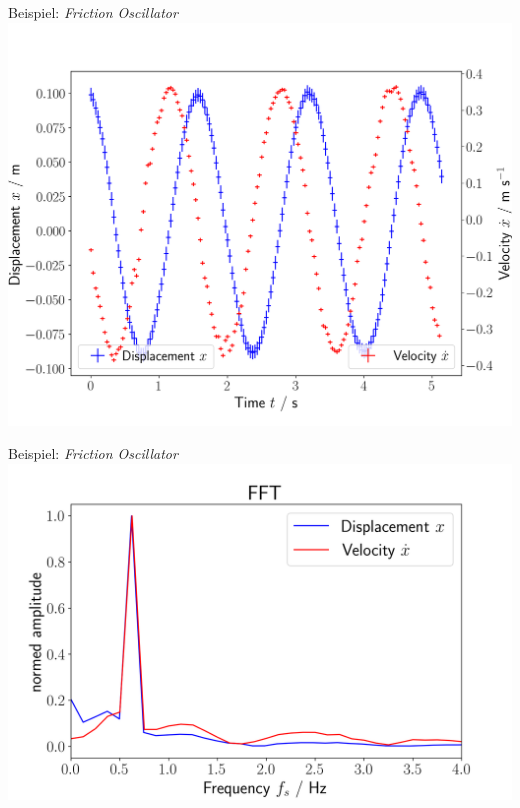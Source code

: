\documentclass[9pt]{beamer}
\begin{document}
\begin{frame}{Beispiel: \emph{Friction Oscillator}}
  \includegraphics[width=\textwidth]{photos/oscillation}  
\end{frame}

\begin{frame}{Beispiel: \emph{Friction Oscillator}}
  \includegraphics[width=\textwidth]{photos/fft}  
\end{frame}
\end{document}
